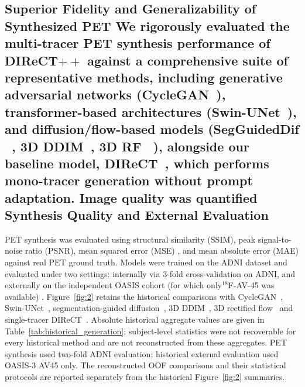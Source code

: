 \documentclass{article}
\providecommand{\DIFaddtex}[1]{{\protect\color{blue} \sf #1}} %
\providecommand{\DIFdeltex}[1]{{\protect\color{red} \scriptsize #1}} %
\providecommand{\DIFaddbegin}{} %
\providecommand{\DIFaddend}{} %
\providecommand{\DIFdelbegin}{} %
\providecommand{\DIFdelend}{} %
\providecommand{\DIFadd}[1]{\texorpdfstring{\DIFaddtex{#1}}{#1}} %
\providecommand{\DIFdel}[1]{\texorpdfstring{\DIFdeltex{#1}}{}} %
\newcommand{\DIFscaledelfig}{0.5}
\newlength{\DIFdelgraphicswidth} %
\newlength{\DIFdelgraphicsheight} %
\newcommand{\DIFaddincludegraphics}[2][]{{\color{blue}\fbox{\DIFOincludegraphics[#1]{#2}}}} %
\newcommand{\DIFdelincludegraphics}[2][]{%
\sbox{\DIFdelgraphicsbox}{\DIFOincludegraphics[#1]{#2}}%
\settoboxwidth{\DIFdelgraphicswidth}{\DIFdelgraphicsbox} %
\settoboxtotalheight{\DIFdelgraphicsheight}{\DIFdelgraphicsbox} %
\scalebox{\DIFscaledelfig}{%
\parbox[b]{\DIFdelgraphicswidth}{\usebox{\DIFdelgraphicsbox}\\[-\baselineskip] \rule{\DIFdelgraphicswidth}{0em}}\llap{\resizebox{\DIFdelgraphicswidth}{\DIFdelgraphicsheight}{%
\setlength{\unitlength}{\DIFdelgraphicswidth}%
\begin{picture}(1,1)%
\thicklines\linethickness{2pt} %
{\color[rgb]{1,0,0}\put(0,0){\framebox(1,1){}}}%
{\color[rgb]{1,0,0}\put(0,0){\line( 1,1){1}}}%
{\color[rgb]{1,0,0}\put(0,1){\line(1,-1){1}}}%
\end{picture}%
}\hspace*{3pt}}} %
} %
\DeclareRobustCommand{\DIFaddbegin}{\DIFOaddbegin \let\includegraphics\DIFaddincludegraphics} %
\DeclareRobustCommand{\DIFaddend}{\DIFOaddend \let\includegraphics\DIFOincludegraphics} %
\DeclareRobustCommand{\DIFdelbegin}{\DIFOdelbegin \let\includegraphics\DIFdelincludegraphics} %
\DeclareRobustCommand{\DIFdelend}{\DIFOaddend \let\includegraphics\DIFOincludegraphics} %
\begin{document}
\subsection{\DIFdelbegin \DIFdel{Superior Fidelity and Generalizability of Synthesized }\DIFdelend PET \DIFdelbegin %
\DIFdel{We rigorously evaluated the multi-tracer PET synthesis performance of DIReCT$++$ against a comprehensive suite of representative methods, including generative adversarial networks (CycleGAN~\cite{zhu2017unpaired}), transformer-based architectures (Swin-UNet~\cite{Cao2021swin}), and diffusion/flow-based models (SegGuidedDif ~\cite{konz2024anatomically}, 3D DDIM~\cite{Graf2023}, 3D RF ~\cite{Xing2022}), alongside our baseline model, DIReCT~\cite{liu2025direct}, which performs mono-tracer generation without prompt adaptation. Image quality was quantified }\DIFdelend \DIFaddbegin \DIFadd{Synthesis Quality and External Evaluation}}
\DIFadd{PET synthesis was evaluated }\DIFaddend using structural similarity (SSIM), peak signal-to-noise ratio (PSNR), mean squared error (MSE) \DIFdelbegin \DIFdel{, }\DIFdelend and mean absolute error (MAE)\DIFdelbegin \DIFdel{against real PET ground truth. Models were trained on the ADNI dataset and evaluated under two settings: internally via 3-fold cross-validation on ADNI, and externally on the independent OASIS cohort (for which only$^{18}$F-AV-45 was available)}\DIFdelend \DIFaddbegin \DIFadd{. Figure~\ref{fig:2} retains the historical comparisons with CycleGAN~\cite{zhu2017unpaired}, Swin-UNet~\cite{Cao2021swin}, segmentation-guided diffusion~\cite{konz2024anatomically}, 3D DDIM~\cite{song2021ddim,pinaya2023generative}, 3D rectified flow~\cite{Xing2022} and single-tracer DIReCT~\cite{liu2025direct}. Absolute historical aggregate values are given in Table~\ref{tab:historical_generation}; subject-level statistics were not recoverable for every historical method and are not reconstructed from these aggregates.
PET synthesis used two-fold ADNI evaluation; historical external evaluation used OASIS-3 AV45 only. The reconstructed OOF comparisons and their statistical protocols are reported separately from the historical Figure~\ref{fig:2} summaries}\DIFaddend .
\end{document}
